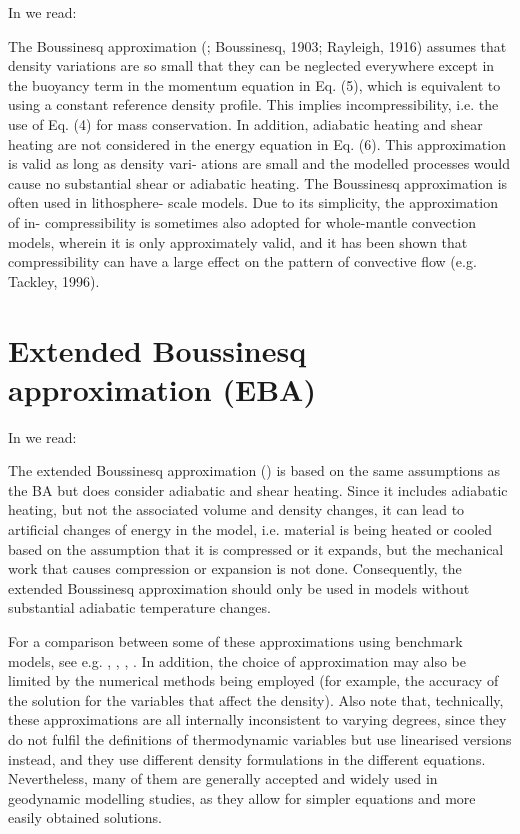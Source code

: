 \documentclass[a4paper]{article}
\begin{document}
In \textcite{vacp22} we read: 
\begin{displayquote}
The Boussinesq approximation (\textcite{ober79}; Boussinesq, 1903; Rayleigh, 1916) 
assumes that density
variations are so small that they can be neglected everywhere
except in the buoyancy term in the momentum equation in
Eq. (5), which is equivalent to using a constant reference
density profile. This implies incompressibility, i.e. the use of
Eq. (4) for mass conservation. In addition, adiabatic heating
and shear heating are not considered in the energy equation
in Eq. (6). This approximation is valid as long as density vari-
ations are small and the modelled processes would cause no substantial 
shear or adiabatic heating.
The Boussinesq approximation is often used in lithosphere-
scale models. Due to its simplicity, the approximation of in-
compressibility is sometimes also adopted for whole-mantle
convection models, wherein it is only approximately valid,
and it has been shown that compressibility can have a large
effect on the pattern of convective flow (e.g. Tackley, 1996).
\end{displayquote}





\newpage
\section{Extended Boussinesq approximation (EBA)}

In \textcite{vacp22} we read: 
\begin{displayquote}
The extended Boussinesq approximation (\cite{chyu85,oxtu78}) is based
on the same assumptions as the BA but does consider adiabatic 
and shear heating. Since it includes adiabatic heating,
but not the associated volume and density changes, it can
lead to artificial changes of energy in the model, i.e. material 
is being heated or cooled based on the assumption that
it is compressed or it expands, but the mechanical work that
causes compression or expansion is not done. Consequently,
the extended Boussinesq approximation should only be used
in models without substantial adiabatic temperature changes.

For a comparison between some of these approximations
using benchmark models, see e.g. \textcite{sthe89},
\textcite{lezh08}, \textcite{kilv10}, \textcite{gadb20}. 
In addition, the choice of approximation may
also be limited by the numerical methods being employed
(for example, the accuracy of the solution for the variables
that affect the density). Also note that, technically, these 
approximations are all internally inconsistent to varying 
degrees, since they do not fulfil the definitions of
thermodynamic variables but use linearised versions instead,
and they use different density formulations in the different 
equations. Nevertheless, many of them are generally accepted 
and widely used in geodynamic modelling studies, as
they allow for simpler equations and more easily obtained solutions.
\end{displayquote}








\newpage
\printbibliography
\end{document}
